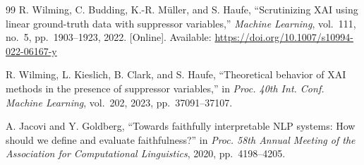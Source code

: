 \documentclass{cleiej}
\begin{document}
\begin{thebibliography}{99}
R. Wilming, C. Budding, K.-R. M\"{u}ller, and S. Haufe, ``Scrutinizing XAI
using linear ground-truth data with suppressor variables,'' \emph{Machine
Learning}, vol.~111, no.~5, pp.~1903--1923, 2022. [Online]. Available:
\url{https://doi.org/10.1007/s10994-022-06167-y}

R. Wilming, L. Kieslich, B. Clark, and S. Haufe, ``Theoretical behavior of
XAI methods in the presence of suppressor variables,'' in \emph{Proc. 40th
Int. Conf. Machine Learning}, vol.~202, 2023, pp.~37091--37107.

A. Jacovi and Y. Goldberg, ``Towards faithfully interpretable NLP systems:
How should we define and evaluate faithfulness?'' in \emph{Proc. 58th
Annual Meeting of the Association for Computational Linguistics}, 2020,
pp.~4198--4205.

\end{thebibliography}
\end{document}
